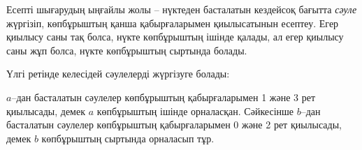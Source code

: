 
\begin{center}
\end{center}

Есепті шығарудың ыңғайлы жолы -- нүктеден басталатын
кездейсоқ бағытта \emph{сәуле} жүргізіп, көпбұрыштың қанша 
қабырғаларымен қиылысатынын есептеу. Егер қиылысу саны тақ болса,
нүкте көпбұрыштың ішінде қалады, ал егер қиылысу саны жұп болса,
нүкте көпбұрыштың сыртында болады.


\begin{samepage}
Үлгі ретінде келесідей сәулелерді жүргізуге болады:
\begin{center}
\end{center}
\end{samepage}

$a$–дан басталатын сәулелер көпбұрыштың қабырғаларымен 1 және 3 рет қиылысады, 
демек $a$ көпбұрыштың ішінде орналасқан. Сәйкесінше
$b$–дан басталатын сәулелер көпбұрыштың қабырғаларымен 0 және 2 рет қиылысады, демек 
$b$ көпбұрыштың сыртында орналасып тұр.

